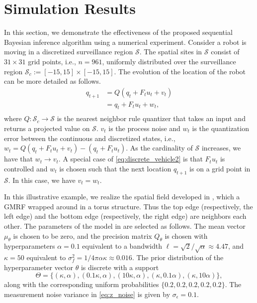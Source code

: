 \documentclass[letterpaper, 10 pt, conference]{ieeeconf}
\newcommand{\set}[1]{\{#1\}} \newcommand{\norm}[1]{\|#1\|}
\newcommand{\mc}[1]{\mathcal{#1}} \newcommand{\mb}[1]{\mathbf{#1}}
\begin{document}
\section{Simulation Results}\label{sec:simulation}

In this section, we demonstrate the effectiveness of the proposed sequential Bayesian inference algorithm using a numerical experiment. 
Consider a robot is moving in a discretized surveillance region $\mc{S}$. 
The spatial sites in $\mc{S}$ consist of $31 \times 31$ grid points, i.e., $n=961$, uniformly distributed over the surveillance region $\mc{S}_c:=[-15, 15] \times [-15, 15]$. 
The evolution of the location of the robot can be more detailed as follows.
\begin{equation}
\begin{split}
q_{t+1} &=Q \left ( q_{t} +F_t u_t + v_t \right )\\
&= q_{t} +F_t u_t + w_t,\\ 
\end{split}
\label{eq:discrete_vehicle2}
\end{equation}
where $Q: \mc{S}_c \rightarrow \mc{S}$ is the nearest neighbor rule quantizer that takes an input and returns a projected value on $\mc{S}$. 
$v_t$ is the process noise and $w_t$ is the quantization error between the continuous and discretized states, i.e., 
$w_t=Q \left ( q_{t} +F_t u_t + v_t \right )- (q_{t} +F_t u_t).$ As the cardinality of $\mc{S}$ increases, we have that $w_t \rightarrow v_t$. A special case of \eqref{eq:discrete_vehicle2} is that $F_t u_t$ is controlled and $w_t$ is chosen such that the next location $q_{t+1}$ is on a grid point in $\mc{S}$. In this case, we have $v_t=w_t$.
 



In this illustrative example, we realize the spatial field developed in \cite{jadaliha2012efficient}, which a GMRF wrapped around in a torus structure. Thus the top edge (respectively, the left edge) and the bottom edge (respectively, the right edge) are neighbors each other.
The parameters of the model in \cite{jadaliha2012efficient}
are selected as follows. The mean vector $\mu_{\theta}$ is chosen to be zero, and the precision matrix $Q_{\theta}$ is chosen with hyperparameters $\alpha = 0.1$ equivalent to a bandwidth $\ell = {\sqrt{2}}/{\sqrt{\alpha}} \approx 4.47$, and $\kappa = 50$ equivalent to $\sigma_f^2 = 1/4\pi \alpha \kappa \approx 0.016$. 
 The prior distribution of the hyperparameter vector $\theta$ is discrete with a support 
\[\Theta = \set{(\kappa, \alpha), (0.1 \kappa, \alpha), (10 \kappa, \alpha), (\kappa, 0.1 \alpha), (\kappa, 10 \alpha)},\] along with the corresponding uniform probabilities $\set{0.2, 0.2, 0.2, 0.2, 0.2}$. 
The measurement noise variance in \eqref{eq:z_noise} is given by $\sigma_\epsilon= 0.1$.
\end{document}
